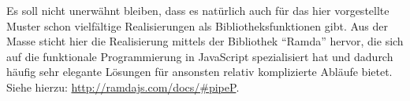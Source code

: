 \documentclass[
11pt, %
a4paper, %
oneside, %
pdfspacing, %
headinclude,
BCOR5mm, %
ngerman, %
bibtotocnumbered,
]{scrartcl}
\begin{document}
	
	Es soll nicht unerwähnt bleiben, dass es natürlich auch für das hier vorgestellte Muster schon vielfältige Realisierungen als Bibliotheksfunktionen gibt. Aus der Masse sticht hier die Realisierung mittels der Bibliothek "`Ramda"' hervor, die sich auf die funktionale Programmierung in JavaScript spezialisiert hat und dadurch häufig sehr elegante Lösungen für ansonsten relativ komplizierte Abläufe bietet. Siehe hierzu: \url{http://ramdajs.com/docs/#pipeP}.
	
%	
%		
%		
%		
\end{document}
